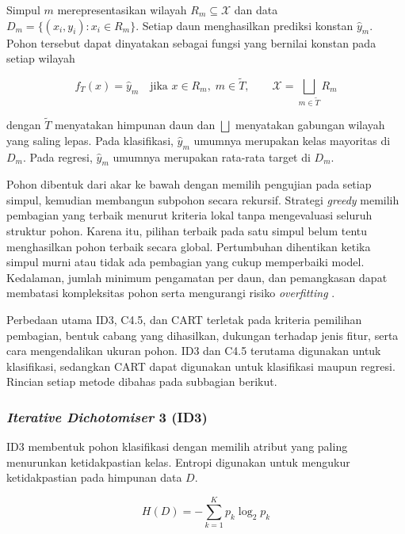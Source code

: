 Simpul $m$ merepresentasikan wilayah $R_m\subseteq\mathcal{X}$ dan data $D_m=\{(x_i,y_i):x_i\in R_m\}$. Setiap daun menghasilkan prediksi konstan $\hat{y}_m$. Pohon tersebut dapat dinyatakan sebagai fungsi yang bernilai konstan pada setiap wilayah

\begin{equation}
    f_T(x)=\hat{y}_m\quad\text{jika }x\in R_m,\;m\in\widetilde{T},
    \qquad \mathcal{X}=\bigsqcup_{m\in\widetilde{T}}R_m
    \label{eq:tree-piecewise}
\end{equation}

dengan $\widetilde{T}$ menyatakan himpunan daun dan $\bigsqcup$ menyatakan gabungan wilayah yang saling lepas. Pada klasifikasi, $\hat{y}_m$ umumnya merupakan kelas mayoritas di $D_m$. Pada regresi, $\hat{y}_m$ umumnya merupakan rata-rata target di $D_m$.

Pohon dibentuk dari akar ke bawah dengan memilih pengujian pada setiap simpul, kemudian membangun subpohon secara rekursif. Strategi \textit{greedy} memilih pembagian yang terbaik menurut kriteria lokal tanpa mengevaluasi seluruh struktur pohon. Karena itu, pilihan terbaik pada satu simpul belum tentu menghasilkan pohon terbaik secara global. Pertumbuhan dihentikan ketika simpul murni atau tidak ada pembagian yang cukup memperbaiki model. Kedalaman, jumlah minimum pengamatan per daun, dan pemangkasan dapat membatasi kompleksitas pohon serta mengurangi risiko \textit{overfitting} \cite{quinlan1986id3,quinlan1993c45,breiman1984cart}.

Perbedaan utama ID3, C4.5, dan CART terletak pada kriteria pemilihan pembagian, bentuk cabang yang dihasilkan, dukungan terhadap jenis fitur, serta cara mengendalikan ukuran pohon. ID3 dan C4.5 terutama digunakan untuk klasifikasi, sedangkan CART dapat digunakan untuk klasifikasi maupun regresi. Rincian setiap metode dibahas pada subbagian berikut.

\subsubsection{\textit{Iterative Dichotomiser} 3 (ID3)}

ID3 membentuk pohon klasifikasi dengan memilih atribut yang paling menurunkan ketidakpastian kelas. Entropi digunakan untuk mengukur ketidakpastian pada himpunan data $D$.

\begin{equation}
    H(D)=-\sum_{k=1}^{K}p_k\log_2 p_k
    \label{eq:id3-entropy}
\end{equation}


